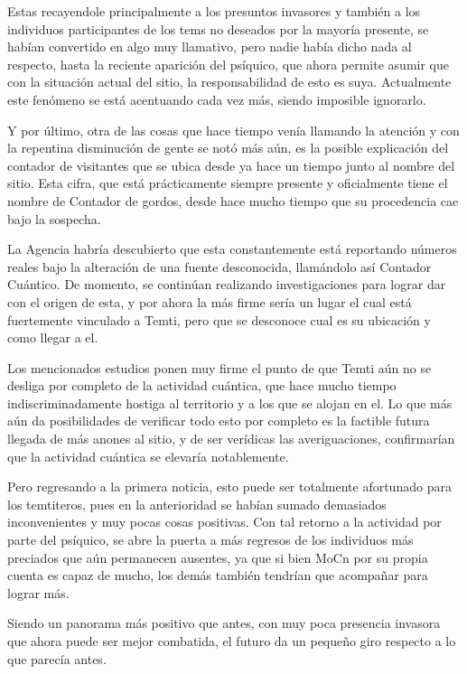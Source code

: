 \documentclass[
]{book}
\begin{document}
Estas recayendole principalmente a los presuntos invasores y también a los individuos participantes de los tems no deseados por la mayoría presente, se habían convertido en algo muy llamativo, pero nadie había dicho nada al respecto, hasta la reciente aparición del psíquico, que ahora permite asumir que con la situación actual del sitio, la responsabilidad de esto es suya. Actualmente este fenómeno se está acentuando cada vez más, siendo imposible ignorarlo.

Y por último, otra de las cosas que hace tiempo venía llamando la atención y con la repentina disminución de gente se notó más aún, es la posible explicación del contador de visitantes que se ubica desde ya hace un tiempo junto al nombre del sitio. Esta cifra, que está prácticamente siempre presente y oficialmente tiene el nombre de Contador de gordos, desde hace mucho tiempo que su procedencia cae bajo la sospecha.

La Agencia habría descubierto que esta constantemente está reportando números reales bajo la alteración de una fuente desconocida, llamándolo así Contador Cuántico. De momento, se continúan realizando investigaciones para lograr dar con el origen de esta, y por ahora la más firme sería un lugar el cual está fuertemente vinculado a Temti, pero que se desconoce cual es su ubicación y como llegar a el.

Los mencionados estudios ponen muy firme el punto de que Temti aún no se desliga por completo de la actividad cuántica, que hace mucho tiempo indiscriminadamente hostiga al territorio y a los que se alojan en el. Lo que más aún da posibilidades de verificar todo esto por completo es la factible futura llegada de más anones al sitio, y de ser verídicas las averiguaciones, confirmarían que la actividad cuántica se elevaría notablemente.

Pero regresando a la primera noticia, esto puede ser totalmente afortunado para los temtiteros, pues en la anterioridad se habían sumado demasiados inconvenientes y muy pocas cosas positivas. Con tal retorno a la actividad por parte del psíquico, se abre la puerta a más regresos de los individuos más preciados que aún permanecen ausentes, ya que si bien MoCn por su propia cuenta es capaz de mucho, los demás también tendrían que acompañar para lograr más.

Siendo un panorama más positivo que antes, con muy poca presencia invasora que ahora puede ser mejor combatida, el futuro da un pequeño giro respecto a lo que parecía antes.
\end{document}
